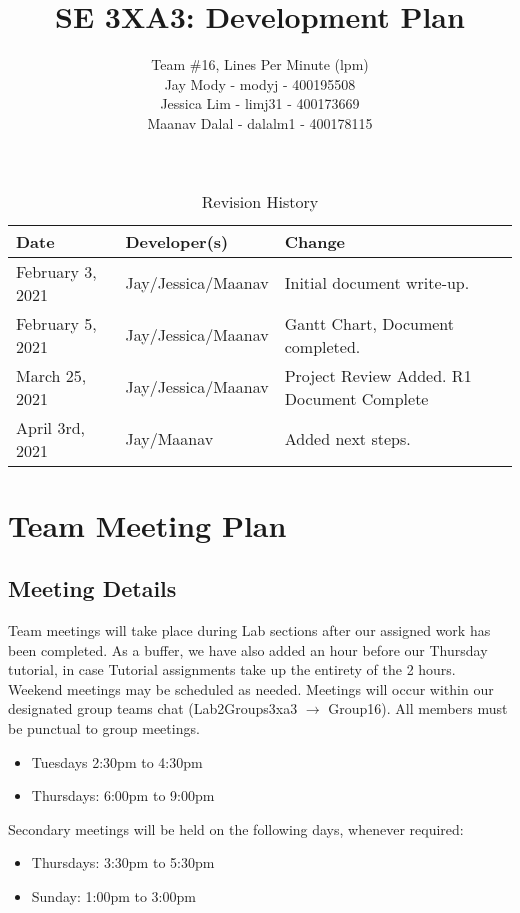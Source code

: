 \documentclass{article}
\title{\textbf{SE 3XA3: Development Plan}}
\author{Team \#16, Lines Per Minute (lpm) \\
Jay Mody - modyj - 400195508\\
Jessica Lim - limj31 - 400173669\\
Maanav Dalal - dalalm1 - 400178115\\
}
\begin{document}
\maketitle

\begin{table}[hp]
\caption{Revision History} \label{TblRevisionHistory}
\begin{tabularx}{\textwidth}{llX}
\toprule
\textbf{Date} & \textbf{Developer(s)} & \textbf{Change}\\
\midrule
February 3, 2021 & Jay/Jessica/Maanav & Initial document write-up. \\
February 5, 2021 & Jay/Jessica/Maanav & Gantt Chart, Document completed. \\
March 25, 2021 & Jay/Jessica/Maanav & Project Review Added. R1 Document Complete \\
April 3rd, 2021 & Jay/Maanav & Added next steps. \\
\bottomrule
\end{tabularx}
\end{table}

\newpage

\section{Team Meeting Plan}
\subsection*{Meeting Details}
Team meetings will take place during Lab sections after our assigned work has been completed. As a buffer, we have also added
an hour before our Thursday tutorial, in case Tutorial assignments take up the entirety of the 2 hours. Weekend meetings may be scheduled as needed. Meetings will occur within our designated group teams chat (Lab2Groups3xa3 $\rightarrow$ Group16). All members must be punctual to group meetings.
\begin{itemize}
    \item Tuesdays 2:30pm to 4:30pm
    \item Thursdays: 6:00pm to 9:00pm
\end{itemize}
Secondary meetings will be held on the following days, whenever required:
\begin{itemize}
    \item Thursdays: 3:30pm to 5:30pm
    \item Sunday: 1:00pm to 3:00pm
\end{itemize}
\end{document}
